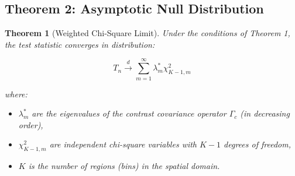 \documentclass[12pt]{article}
\theoremstyle{plain}
\newtheorem{theorem}{Theorem}
\theoremstyle{definition}
\newcommand{\dto}{\xrightarrow{d}}
\newcommand{\1}[1]{\mathbf{1}_{#1}}
\begin{document}
\subsection{Theorem 2: Asymptotic Null Distribution}

\begin{theorem}[Weighted Chi-Square Limit]
Under the conditions of Theorem 1, the test statistic converges in distribution:

\begin{equation}
T_n \dto \sum_{m=1}^\infty \lambda_m^* \chi^2_{K-1,m}
\end{equation}

where:
\begin{itemize}
\item $\lambda_m^*$ are the eigenvalues of the contrast covariance operator $\Gamma_c$ (in decreasing order),
\item $\chi^2_{K-1,m}$ are independent chi-square variables with $K-1$ degrees of freedom,
\item $K$ is the number of regions (bins) in the spatial domain.
\end{itemize}
\end{theorem}
\end{document}
